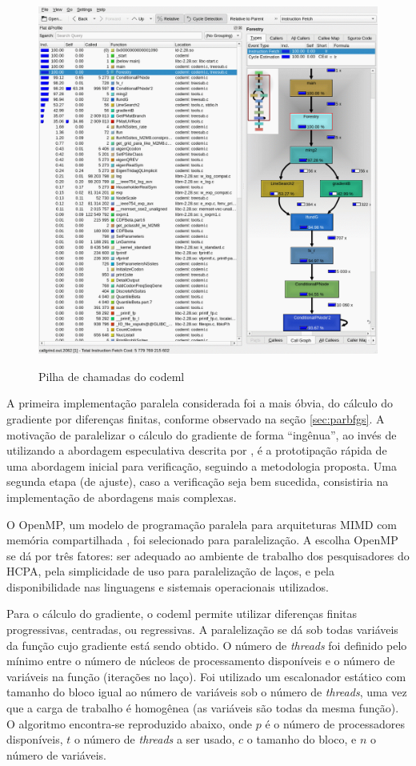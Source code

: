 \documentclass[cic,tc]{iiufrgs}
\begin{document}
\begin{figure} \caption{Pilha de chamadas do codeml} \begin{center}
\includegraphics[width=0.9\linewidth]{img/kcachegrind.png} \end{center}
 \label{fig:kcachegrind} \end{figure}

A primeira implementação paralela considerada foi a mais óbvia, do cálculo do
gradiente por diferenças finitas, conforme observado na seção
\ref{sec:parbfgs}. A motivação de paralelizar o cálculo do gradiente de forma
``ingênua'', ao invés de utilizando a abordagem especulativa descrita por
\cite{byrd1988parallel}, é a prototipação rápida de uma abordagem inicial para
verificação, seguindo a metodologia proposta. Uma segunda etapa (de ajuste),
caso a verificação seja bem sucedida, consistiria na implementação de
abordagens mais complexas.

O OpenMP, um modelo de programação paralela para arquiteturas MIMD com memória
compartilhada \cite{chandra2001parallel}, foi selecionado para paralelização. A
escolha OpenMP se dá por três fatores: ser adequado ao ambiente de trabalho dos
pesquisadores do HCPA, pela simplicidade de uso para paralelização de laços, e
pela disponibilidade nas linguagens e sistemais operacionais utilizados.

Para o cálculo do gradiente, o codeml permite utilizar diferenças finitas
progressivas, centradas, ou regressivas. A paralelização se dá sob todas
variáveis da função cujo gradiente está sendo obtido. O número de
\textit{threads} foi definido pelo mínimo entre o número de núcleos de
processamento disponíveis e o número de variáveis na função (iterações no
laço). Foi utilizado um escalonador estático com tamanho do bloco igual ao
número de variáveis sob o número de \textit{threads}, uma vez que a carga de
trabalho é homogênea (as variáveis são todas da mesma função). O algoritmo
encontra-se reproduzido abaixo, onde $p$ é o número de processadores
disponíveis, $t$ o número de \textit{threads} a ser usado, $c$ o tamanho do
bloco, e $n$ o número de variáveis.
\end{document}
